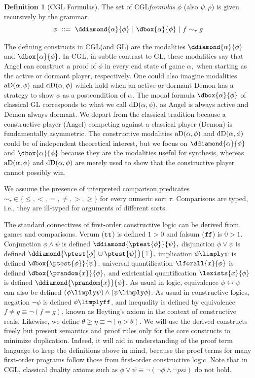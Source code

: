 \documentclass[12pt]{cmuthesis}
\theoremstyle{definition}
\newtheorem{definition}{Definition}
\theoremstyle{remark}
\newcommand{\bebecomes}{\mathrel{::=}}
\newcommand{\alternative}{~|~}
\newcommand{\lequiv}{\leftrightarrow}
\newcommand{\CGL}{\textsf{CGL}\xspace}
\newcommand{\GL}{GL\xspace}
\begin{document}
\begin{definition}[\CGL Formulas]
The set of \CGL \emph{formulas} $\phi$ (also $\psi, \rho$) is given recursively by the grammar:
\[ \phi ~\bebecomes~ \ddiamond{\alpha}{\phi} \alternative \dbox{\alpha}{\phi} \alternative f \sim_\tau g\]
\label{def:cgl-formula}
\end{definition}
The defining constructs in \CGL (and \GL) are the modalities $\ddiamond{\alpha}{\phi}$ and $\dbox{\alpha}{\phi}$.
In \CGL, in subtle contrast to \GL, these modalities say that Angel can construct a proof of $\phi$ in every end state of game $\alpha,$ when starting as the active or dormant player, respectively.
One could also imagine modalities $\textrm{aD}(\alpha,\phi)$ and $\textrm{dD}(\alpha,\phi)$ which hold when an active or dormant Demon has a strategy to show $\phi$ as a postcondition of $\alpha$.
The modal formula $\dbox{\alpha}{\phi}$ of classical \GL corresponds to what we call $\textrm{dD}(\alpha,\phi)$, as Angel is always active and Demon always dormant.
We depart from the classical tradition because a constructive player (Angel) competing against a classical player (Demon) is fundamentally asymmetric.
The constructive modalities $\textrm{aD}(\alpha,\phi)$ and $\textrm{dD}(\alpha,\phi)$ could be of independent theoretical interest, but we focus on $\ddiamond{\alpha}{\phi}$ and $\dbox{\alpha}{\phi}$ because they are the modalities useful for synthesis, whereas $\textrm{aD}(\alpha,\phi)$ and $\textrm{dD}(\alpha,\phi)$ are merely used to show that the constructive player cannot possibly win.

We assume the presence of interpreted comparison predicates $\sim_\tau \in \{\leq, <, =, \neq, >, \geq\}$ for every numeric sort $\tau$.
Comparisons are typed, i.e., they are ill-typed for arguments of different sorts.

The standard connectives of first-order constructive logic can be derived from games and comparisons.
Verum ($\texttt{tt}$) is defined $1 > 0$ and falsum ($\texttt{ff}$) is $0 > 1$.
Conjunction $\phi \land \psi$ is defined $\ddiamond{\ptest{\phi}}{\psi},$ 
disjunction $\phi \lor  \psi$ is defined $\ddiamond{\ptest{\phi} \cup \ptest{\psi}}{\top},$
implication $\phi \limply \psi$ is defined $\dbox{\ptest{\phi}}{\psi}$,
universal quantification $\lforall{x}{\phi}$ is defined $\dbox{\prandom{x}}{\phi},$ and 
existential quantification $\lexists{x}{\phi}$ is defined $\ddiamond{\prandom{x}}{\phi}$.
As usual in logic, equivalence $\phi \lequiv \psi$ can also be defined $(\phi \limply \psi) \land (\psi \limply \phi)$.
As usual in constructive logics, negation $\neg \phi$ is defined $\phi \limply \bff$, and inequality is defined by equivalence $f \neq g \equiv \neg(f = g)$, known as Heyting's axiom in the context of constructive reals.
Likewise, we define $\theta \geq \eta \equiv \neg(\eta > \theta)$.
We will use the derived constructs freely but present semantics and proof rules only for the core constructs to minimize duplication.
Indeed, it will aid in understanding of the proof term language to keep the definitions above in mind, because the proof terms for many first-order programs follow those from first-order constructive logic.
Note that in \CGL, classical duality axioms such as $\phi \lor \psi \equiv \neg(\neg \phi \land \neg psi)$ do not hold.
\end{document}
